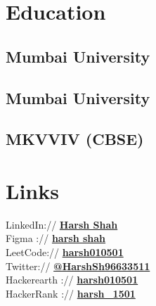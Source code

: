 \documentclass[]{deedy-resume-openfont}
\begin{document}
%
%
\lastupdated

%
%


%
%

\begin{minipage}[t]{0.33\textwidth} 


\section{Education} 

\subsection{Mumbai University}
\sectionsep

\subsection{Mumbai University}
\sectionsep

\subsection{MKVVIV (CBSE)}
\sectionsep


\section{Links}
LinkedIn://  \href{https://www.linkedin.com/in/harsh-shah-84492a144/}{\bf Harsh Shah} \\
Figma :// \href{https://www.figma.com/files/user/972091920433097624?fuid=972091920433097624}{\bf harsh shah} \\
LeetCode://  \href{https://leetcode.com/harsh010501/}{\bf harsh010501} \\
Twitter://  \href{https://twitter.com/HarshSh96633511}{\bf @HarshSh96633511} \\
Hackerearth :// \href{https://www.hackerearth.com/@harsh010501}{\bf harsh010501} \\
HackerRank :// \href{https://www.hackerrank.com/harsh_1501}{\bf harsh\_1501} \\


\end{minipage}
\end{document}
